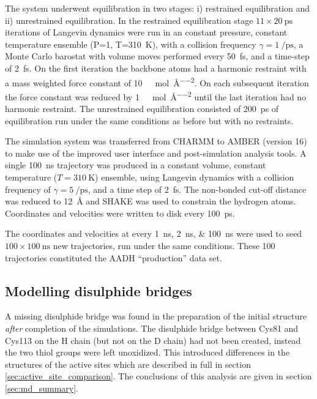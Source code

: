 The system underwent equilibration in two stages: i) restrained equilibration and ii) unrestrained equilibration. In the restrained equilibration stage $11 \times \SI{20}{\pico\second}$ iterations of Langevin dynamics were run in an constant pressure, constant temperature ensemble (P=\SI{1}{\atm}, T=\SI{310}{\kelvin}), with a collision frequency $\gamma=\SI{1}{\per\pico\second}$, a Monte Carlo barostat with volume moves performed every \SI{50}{\femto\second}, and a time-step of \SI{2}{\femto\second}. On the first iteration the backbone atoms had a harmonic restraint with a mass weighted force constant of  \SI{10}{\kilo\cal\per\mol\per\square\angstrom}. On each subsequent iteration the force constant was reduced by \SI{1}{\kilo\cal\per\mol\per\square\angstrom} until the last iteration had no harmonic restraint. The unrestrained equilibration consisted of \SI{200}{\pico\second} of equilibration run under the same conditions as before but with no restraints. 

The simulation system was transferred from CHARMM to AMBER (version 16) \cite{caseAMBER} to make use of the improved user interface and post-simulation analysis tools. A single  \SI{100}{\nano\second} trajectory was produced in a constant volume, constant temperature ($T=\SI{310}{\kelvin}$) ensemble, using Langevin dynamics with a collision frequency of $\gamma=\SI{5}{\per\pico\second}$, and a time step of \SI{2}{\femto\second}. The non-bonded cut-off distance was reduced to \SI{12}{\angstrom} and SHAKE \cite{ryckaertNumericalIntegrationCartesian1977b} was used to constrain the hydrogen atoms. Coordinates and velocities were written to disk every \SI{100}{\pico\second}.  

The coordinates and velocities at every \SIlist[list-final-separator = { ... }]{1; 2; 100}{\nano\second} were used to seed $100 \times \SI{100}{\nano\second}$ new trajectories, run under the same conditions. These \num{100} trajectories constituted the AADH ``production'' data set. 

\subsection{Modelling disulphide bridges}
A missing disulphide bridge was found in the preparation of the initial structure \emph{after} completion of the simulations. The disulphide bridge between Cys81 and Cys113 on the H chain (but not on the D chain) had not been created, instead the two thiol groups were left unoxidized. This introduced differences in the structures of the active sites which are described in full in section \ref{sec:active_site_comparison}. The conclusions of this analysis are given in section \ref{sec:md_summary}.     

